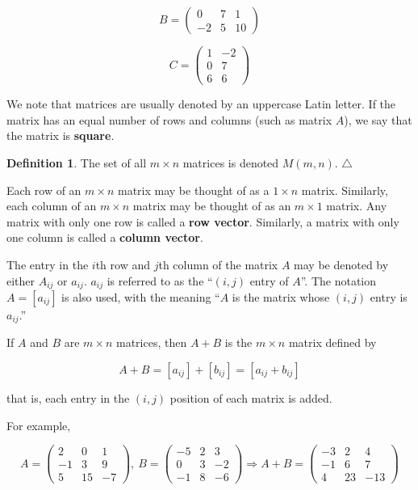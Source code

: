 \documentclass[12pt,a4paper,oneside]{book}
\newcommand\xqed[1]{%
  \leavevmode\unskip\penalty9999 \hbox{}\nobreak\hfill
  \quad\hbox{#1}}
\newcommand\demo{\xqed{$\triangle$}}
\theoremstyle{definition}
\newtheorem{definition}{Definition}[chapter]
\theoremstyle{plain}
\begin{document}
\begin{equation*}
B = \begin{pmatrix} 0 & 7 & 1 \\ -2 & 5 & 10\end{pmatrix}
\end{equation*}

\begin{equation*}
C = \begin{pmatrix} 1 & -2 \\ 0 & 7 \\ 6 & 6\end{pmatrix}
\end{equation*}

We note that matrices are usually denoted by an uppercase Latin letter. If the matrix has an equal number of rows and columns (such as matrix $A$), we say that the matrix is \textbf{square}.

\begin{definition}
The set of all $m\times n$ matrices is denoted $M(m,n)$.
\demo  
\end{definition}

Each row of an $m\times n$ matrix may be thought of as a $1 \times n$ matrix. Similarly, each column of an $m\times n$ matrix may be thought of as an $m \times 1$ matrix. Any matrix with only one row is called a \textbf{row vector}. Similarly, a matrix with only one column is called a \textbf{column vector}.

The entry in the $i$th row and $j$th column of the matrix $A$ may be denoted by either $A_{ij}$ or $a_{ij}$. $a_{ij}$ is referred to as the ``$(i,j)$ entry of $A$''. The notation $A = [a_{ij}]$ is also used, with the meaning ``$A$ is the matrix whose $(i,j)$ entry is $a_{ij}$.''

If $A$ and $B$ are $m \times n$ matrices, then $A + B$ is the $m \times n$ matrix defined by

\begin{equation}
A + B = [a_{ij}] + [b_{ij}] = [a_{ij} + b_{ij}]
\end{equation}

that is, each entry in the $(i,j)$ position of each matrix is added.

For example,


\begin{equation}\label{mat1}
A = \begin{pmatrix} 2 & 0 & 1 \\ -1 & 3 & 9 \\ 5 & 15 & -7\end{pmatrix}, ~ 
B = \begin{pmatrix} -5 & 2 & 3 \\ 0 & 3 & -2 \\ -1 & 8 & -6\end{pmatrix} \Rightarrow
A + B = \begin{pmatrix} -3 & 2 & 4 \\ -1 & 6 & 7 \\ 4 & 23 & -13\end{pmatrix} 
\end{equation}
\end{document}
